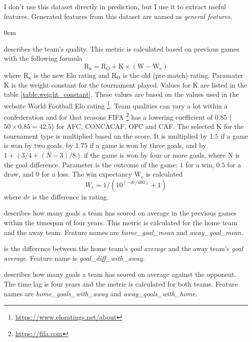 I don't use this dataset directly in prediction, but I use it to extract useful features. Generated features from this dataset are named as \textit{general features}.
\renewcommand{\labelitemi}{}
\begin{description}
    \itemsep0em
    \item[Elo rating:] describes the team's quality. This metric is calculated based on previous games with the following formula \begin{equation}
        \mathrm { R } _ { \mathrm { n } } = \mathrm { R } _ { \mathrm { O } } + \mathrm { K } \times \left( \mathrm { W } - \mathrm { W } _ { \mathrm { e } } \right)
    \end{equation}
    where $\mathrm { R } _ { \mathrm { n } }$ is the new Elo rating and $\mathrm { R }  _ { \mathrm { O } }$ is the old (pre-match) rating. Paramater $\mathrm { K }$ is the weight constant for the tournament played. Values for $\mathrm { K }$ are listed in the table \ref{table:weight_constant}. These values are based on the values used in the website World Football Elo rating \footnote{\url{https://www.eloratings.net/about}}. Team qualities can vary a lot within a confederation and for that reasons FIFA \footnote{\url{https://fifa.com}} has a lowering coefficient of $0.85$ ($50 \times 0.85 = 42.5$) for AFC, CONCACAF, OFC and CAF. The selected $\mathrm { K }$ for the tournament type is multiplied based on the score. It is multiplied by $1.5$ if a game is won by two goals, by $1.75$ if a game is won by three goals, and by $1 + (3/4 + (N-3)/8)$ if the game is won by four or more goals, where N is the goal difference. Parameter  is the outcome of the game: $1$ for a win, $0.5$ for a draw, and $0$ for a loss. The win expectancy $\mathrm { W } _ { \mathrm { e } }$ is calculated
    \begin{equation}
        W _ { e } = 1 / \left( 10 ^ { ( - d r / 400 ) } + 1 \right)
    \end{equation}
    where $dr$ is the difference in rating.

    \item[Goal average:] describes how many goals a team has scored on average in the previous games within the timespan of four years. This metric is calculated for the home team and the away team. Feature names are \textit{home\_goal\_mean} and \textit{away\_goal\_mean}.
    \item[Goal average difference:] is the difference between the home team's \textit{goal average} and the away team's \textit{goal average}. Feature name is \textit{goal\_diff\_with\_away}.
    \item[Goal average with the opponent:] describes how many goals a team has scored on average against the opponent. The time lag is four years and the metric is calculated for both teams. Feature names are \textit{home\_goals\_with\_away} and \textit{away\_goals\_with\_home}.
\end{description}

